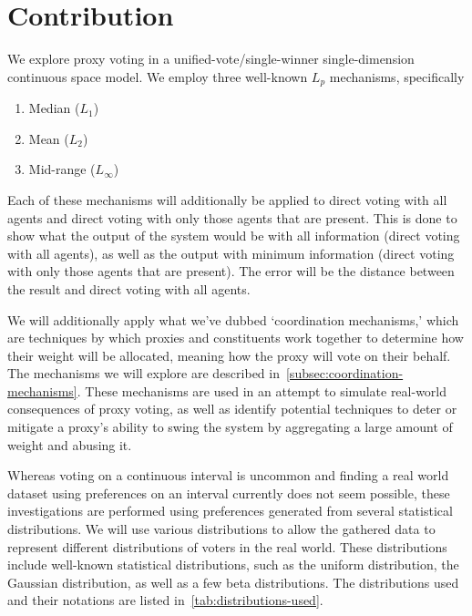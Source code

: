 \section{Contribution}\label{sec:contribution}
We explore proxy voting in a unified-vote/single-winner single-dimension
continuous space model.
We employ three well-known $L_p$ mechanisms, specifically
\begin{enumerate}
    \item {
        Median ($L_1$)
    }
    \item {
        Mean ($L_2$)
    }
    \item {
        Mid-range ($L_\infty$)
    }
\end{enumerate}
Each of these mechanisms will additionally be applied to direct voting with all
agents and direct voting with only those agents that are present.
This is done to show what the output of the system would be with all information
(direct voting with all agents), as well as the output with minimum information
(direct voting with only those agents that are present).
The error will be the distance between the result and direct voting with all agents.

We will additionally apply what we've dubbed `coordination mechanisms,' which are
techniques by which proxies and constituents work together to determine how their
weight will be allocated, meaning how the proxy will vote on their behalf.
The mechanisms we will explore are described
in~\autoref{subsec:coordination-mechanisms}.
These mechanisms are used in an attempt to simulate real-world consequences of proxy
voting, as well as identify potential techniques to deter or mitigate a proxy's
ability to swing the system by aggregating a large amount of weight and abusing it.

Whereas voting on a continuous interval is uncommon and finding a real world dataset
using preferences on an interval currently does not seem possible, these investigations
are performed using preferences generated from several statistical distributions.
We will use various distributions to allow the gathered data to represent
different distributions of voters in the real world.
These distributions include well-known statistical distributions, such as the uniform
distribution, the Gaussian distribution, as well as a few beta distributions.
The distributions used and their notations are listed
in~\autoref{tab:distributions-used}.

